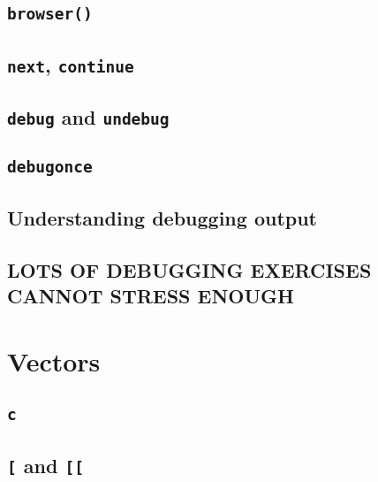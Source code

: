 \documentclass[
]{book}
\begin{document}
\hypertarget{browser}{%
\section{\texorpdfstring{\texttt{browser()}}{browser()}}\label{browser}}

\hypertarget{next-continue}{%
\section{\texorpdfstring{\texttt{next}, \texttt{continue}}{next, continue}}\label{next-continue}}

\hypertarget{debug-and-undebug}{%
\section{\texorpdfstring{\texttt{debug} and \texttt{undebug}}{debug and undebug}}\label{debug-and-undebug}}

\hypertarget{debugonce}{%
\section{\texorpdfstring{\texttt{debugonce}}{debugonce}}\label{debugonce}}

\hypertarget{understanding-debugging-output}{%
\section{Understanding debugging output}\label{understanding-debugging-output}}

\hypertarget{lots-of-debugging-exercises-cannot-stress-enough}{%
\section{LOTS OF DEBUGGING EXERCISES CANNOT STRESS ENOUGH}\label{lots-of-debugging-exercises-cannot-stress-enough}}

\hypertarget{vectors-1}{%
\chapter{Vectors}\label{vectors-1}}

\hypertarget{c}{%
\section{\texorpdfstring{\texttt{c}}{c}}\label{c}}

\hypertarget{and}{%
\section{\texorpdfstring{\texttt{{[}} and \texttt{{[}{[}}}{{[} and {[}{[}}}\label{and}}
\end{document}
